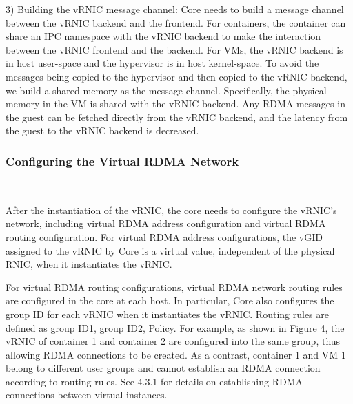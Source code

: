 3) Building the vRNIC message channel: \sys Core needs to build a message channel between the vRNIC backend and the frontend. For containers, the container can share an IPC namespace with the vRNIC backend to make the interaction between the vRNIC frontend and the backend. For VMs, the vRNIC backend is in host user-space and the hypervisor is in host kernel-space. To avoid the messages being copied to the hypervisor and then copied to the vRNIC backend, we build a shared memory as the message channel. Specifically, the physical memory in the VM is shared with the vRNIC backend. Any RDMA messages in the guest can be fetched directly from the vRNIC backend, and the latency from the guest to the vRNIC backend is decreased.

\subsubsection{\textbf{Configuring the Virtual RDMA Network}}
\
\noindent

After the instantiation of the vRNIC, the \sys core needs to configure the vRNIC's network, including virtual RDMA address configuration and virtual RDMA routing configuration.
For virtual RDMA address configurations, the vGID assigned to the vRNIC by \sys Core is a virtual value, independent of the physical RNIC, when it instantiates the vRNIC.


For virtual RDMA routing configurations, virtual RDMA network routing rules are configured in the \sys core at each host. In particular, \sys Core also configures the group ID for each vRNIC when it instantiates the vRNIC. Routing rules are defined as {group ID1, group ID2, Policy}. For example, as shown in Figure 4, the vRNIC of container 1 and container 2 are configured into the same group, thus allowing RDMA connections to be created. As a contrast, container 1 and VM 1 belong to different user groups and cannot establish an RDMA connection according to routing rules. See 4.3.1 for details on establishing RDMA connections between virtual instances.

